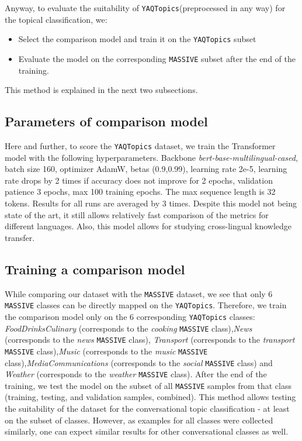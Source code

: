 Anyway, to evaluate the suitability of \texttt{YAQTopics}(preprocessed in any way) for the topical classification, we:
\begin{itemize}
\item Select the comparison model and train it on the \texttt{YAQTopics} subset 
\item Evaluate the model on the corresponding \texttt{MASSIVE} subset after the end of the training. 
\end{itemize}
This method is explained in the next two subsections. 

\subsection{Parameters of comparison model}
Here and further, to score the \texttt{YAQTopics} dataset, we train the Transformer model with the following hyperparameters. Backbone \textit{bert-base-multilingual-cased}, batch size 160, optimizer AdamW, betas (0.9,0.99), learning rate 2e-5, learning rate drops by 2 times if accuracy does not improve for 2 epochs, validation patience 3 epochs, max 100 training epochs. The max sequence length is 32 tokens. Results for all runs are averaged by 3 times. 
Despite this model not being state of the art, it still allows relatively fast comparison of the metrics for different languages. Also, this model allows for studying cross-lingual knowledge transfer. 

\subsection{Training a comparison model} 
While comparing our dataset with the \texttt{MASSIVE} dataset, we see that only 6 \texttt{MASSIVE} classes can be directly mapped on the \texttt{YAQTopics}. Therefore, we train the comparison model only on the 6 corresponding \texttt{YAQTopics} classes: \textit{FoodDrinksCulinary} (corresponds to the \textit{cooking} \texttt{MASSIVE} class),\textit{News} (corresponds to the \textit{news} \texttt{MASSIVE} class), \textit{Transport} (corresponds to the \textit{transport} \texttt{MASSIVE} class),\textit{Music} (corresponds to the \textit{music} \texttt{MASSIVE} class),\textit{MediaCommunications} (corresponds to the \textit{social} \texttt{MASSIVE} class) and \textit{Weather} (corresponds to the \textit{weather} \texttt{MASSIVE} class). 
After the end of the training, we test the model on the subset of all \texttt{MASSIVE} samples from that class (training, testing, and validation samples, combined). This method allows testing the suitability of the dataset for the conversational topic classification - at least on the subset of classes. However, as examples for all classes were collected similarly, one can expect similar results for other conversational classes as well. 

